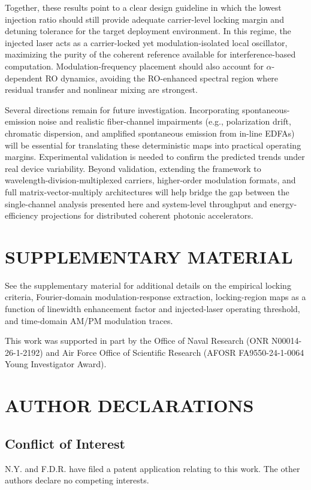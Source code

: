 \documentclass[%
 aip,
 apl,
 amsmath,amssymb,
 reprint,%
 floatfix,
]{revtex4-1}
\begin{document}
Together, these results point to a clear design guideline in which the lowest injection ratio should still provide adequate carrier-level locking margin and detuning tolerance for the target deployment environment. In this regime, the injected laser acts as a carrier-locked yet modulation-isolated local oscillator, maximizing the purity of the coherent reference available for interference-based computation. Modulation-frequency placement should also account for $\alpha$-dependent RO dynamics, avoiding the RO-enhanced spectral region where residual transfer and nonlinear mixing are strongest.

Several directions remain for future investigation. Incorporating spontaneous-emission noise and realistic fiber-channel impairments (e.g., polarization drift, chromatic dispersion, and amplified spontaneous emission from in-line EDFAs) will be essential for translating these deterministic maps into practical operating margins. Experimental validation is needed to confirm the predicted trends under real device variability. Beyond validation, extending the framework to wavelength-division-multiplexed carriers, higher-order modulation formats, and full matrix-vector-multiply architectures will help bridge the gap between the single-channel analysis presented here and system-level throughput and energy-efficiency projections for distributed coherent photonic accelerators.

\section*{SUPPLEMENTARY MATERIAL}
See the supplementary material for additional details on the empirical locking criteria, Fourier-domain modulation-response extraction, locking-region maps as a function of linewidth enhancement factor and injected-laser operating threshold, and time-domain AM/PM modulation traces.

\begin{acknowledgments}
This work was supported in part by the Office of Naval Research (ONR N00014-26-1-2192) and Air Force Office of Scientific Research (AFOSR FA9550-24-1-0064 Young Investigator Award).
\end{acknowledgments}

\section*{AUTHOR DECLARATIONS}

\subsection*{Conflict of Interest}
N.Y. and F.D.R. have filed a patent application relating to this work. The other authors declare no competing interests.
\end{document}

